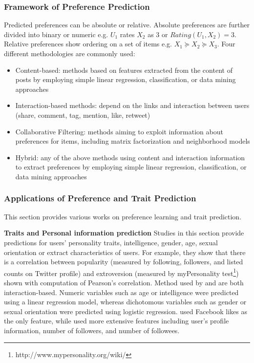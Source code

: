 \documentclass[11pt,a4paper]{article}
\begin{document}
\subsubsection{Framework of Preference Prediction}

Predicted preferences can be absolute or relative. Absolute preferences are further divided into binary or numeric e.g. $U_{1}$ rates $X_{2}$ as $3$ or $Rating(U_{1},  X_{2}) = 3$. Relative preferences show ordering on a set of items e.g. $X_{1} \succeq X_{2} \succeq X_{3}$. Four different methodologies are commonly used:
\begin{itemize}
\item Content-based: methods based on features extracted from the content of posts by employing simple linear regression, classification, or data mining approaches
\item Interaction-based methods: depend on the links and interaction between users (share, comment, tag, mention, like, retweet)
\item Collaborative Filtering: methods aiming to exploit information about preferences for items, including matrix factorization and neighborhood models
\item Hybrid: any of the above methods using content and interaction information to extract preferences by employing simple linear regression, classification, or data mining approaches
\end{itemize}

\subsubsection{Applications of Preference and Trait Prediction}
This section provides various works on preference learning and trait prediction.


\textbf{Traits and Personal information prediction}
Studies in this section provide predictions for users' personality traits, intelligence, gender, age, sexual orientation\cite{kosinski2013private} or extract characteristics of users. For example, they show that there is a correlation between popularity (measured by following, followers, and listed counts on Twitter profile) and extroversion (measured by myPersonality test\footnote{http://www.mypersonality.org/wiki/}) shown with computation of Pearson’s correlation\cite{quercia}.
Method used by \cite{kosinski2013private} and \cite{quercia} are both interaction-based. Numeric variables such as age or intelligence were predicted using a linear regression model, whereas dichotomous variables such as gender or sexual orientation were predicted using logistic regression. \citet{kosinski2013private} used Facebook likes as the only feature, while \citet{quercia} used more extensive features including user's profile information, number of followers, and number of followees.
\end{document}
